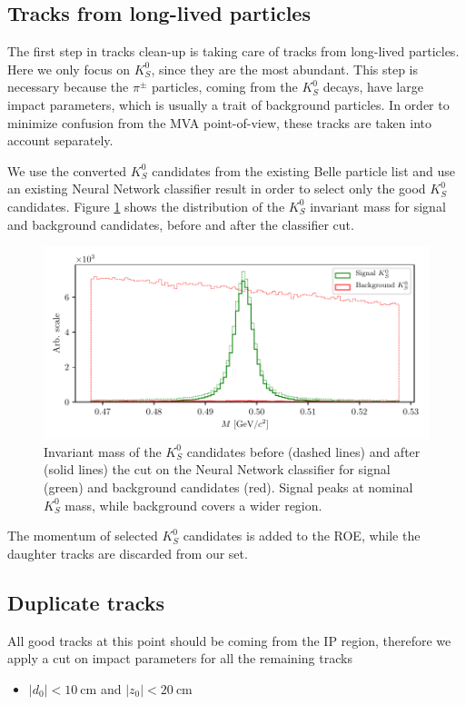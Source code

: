 \documentclass[oneside,a4paper,openany,12pt]{scrbook}
\newcommand {\e}[1]{\mathrm{~#1}}
\begin{document}
\subsection{Tracks from long-lived particles}

The first step in tracks clean-up is taking care of tracks from long-lived particles. Here we only focus on $K_S^0$, since they are the most abundant. This step is necessary because the $\pi^\pm$ particles, coming from the $K_S^0$ decays, have large impact parameters, which is usually a trait of background particles. In order to minimize confusion from the MVA point-of-view, these tracks are taken into account separately.

We use the converted $K_S^0$ candidates from the existing Belle particle list and use an existing Neural Network classifier result in order to select only the good $K_S^0$ candidates. Figure \ref{fig:ROE_V0} shows the distribution of the $K_S^0$ invariant mass for signal and background candidates, before and after the classifier cut.


\begin{figure}[H]
\centering
\captionsetup{width=0.8\linewidth}
\includegraphics[width=\linewidth]{fig/ROECleanup_V0}
\caption{Invariant mass of the $K_S^0$ candidates before (dashed lines) and after (solid lines) the cut on the Neural Network classifier for signal (green) and background candidates (red). Signal peaks at nominal $K_S^0$ mass, while background covers a wider region.}
\label{fig:ROE_V0}
\end{figure}


The momentum of selected $K_S^0$ candidates is added to the ROE, while the daughter tracks are discarded from our set.

\subsection{Duplicate tracks}
All good tracks at this point should be coming from the IP region, therefore we apply a cut on impact parameters for all the remaining tracks
\begin{itemize}
\item $\vert d_0 \vert < 10\e{cm}$ and $\vert z_0 \vert < 20\e{cm}$
\end{itemize} 
\end{document}
